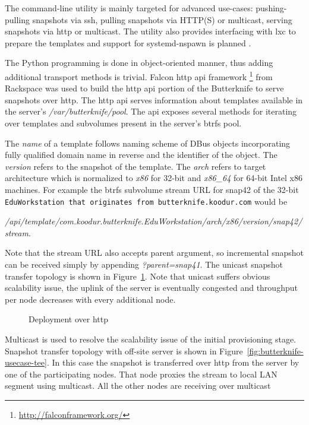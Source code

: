\documentclass[a4paper,11pt]{kth-mag}
\begin{document}
The command-line utility is mainly targeted for
advanced use-cases:
pushing-pulling snapshots via \acrfull{ssh},
pulling snapshots via HTTP(S) or multicast,
serving snapshots via \acrshort{http} or multicast.
The utility also provides interfacing with
\acrshort{lxc} to prepare the templates and
support for systemd-nspawn
is planned \cite{systemd-nspawn}.


The Python programming is done in object-oriented manner,
thus adding additional transport methods is trivial.
Falcon \acrshort{http} \acrshort{api} framework
\footnote{\url{http://falconframework.org/}}
from Rackspace was used to build the
\acrshort{http} \acrshort{api} portion of the Butterknife to serve
snapshots over \acrshort{http}.
The \acrshort{http} \acrshort{api} serves information about templates
available in the server's \emph{/var/butterknife/pool}.
The \acrshort{api} exposes several methods for iterating
over templates and subvolumes present in
the server's \acrshort{btrfs} pool.

The \emph{name} of a template follows naming scheme of DBus objects
incorporating fully qualified domain name in reverse and the identifier
of the object.
The \emph{version} refers to the snapshot of the template.
The \emph{arch} refers to target architecture which is normalized
to \emph{x86} for 32-bit and \emph{x86\_64} for 64-bit Intel x86 machines.
For example the \acrshort{btrfs} subvolume stream URL for
snap42 of the 32-bit
\lstinline!EduWorkstation that originates from butterknife.koodur.com! would be

\emph{/api/template/com.koodur.butterknife.EduWorkstation/arch/x86/version/snap42/stream}.

Note that the stream URL also accepts parent argument,
so incremental snapshot can be received simply by appending
\emph{?parent=snap41}.
The unicast snapshot transfer topology is
shown in Figure~\ref{fig:butterknife-usecase-http}.
Note that unicast suffers obvious scalability issue,
the uplink of the server is eventually congested and
throughput per node decreases with every additional node.

\begin{figure}[!htb]
\centering
\scalebox{0.5}{}
\caption{Deployment over \acrshort{http}}
\label{fig:butterknife-usecase-http}
\end{figure}

Multicast is used to resolve the scalability issue of
the initial provisioning stage.
Snapshot transfer topology with off-site
server is shown in Figure~\ref{fig:butterknife-usecase-tee}.
In this case the snapshot is transferred over \acrshort{http} from
the server by one of the participating nodes.
That node proxies the stream to local LAN segment using multicast.
All the other nodes are receiving over multicast
\end{document}
